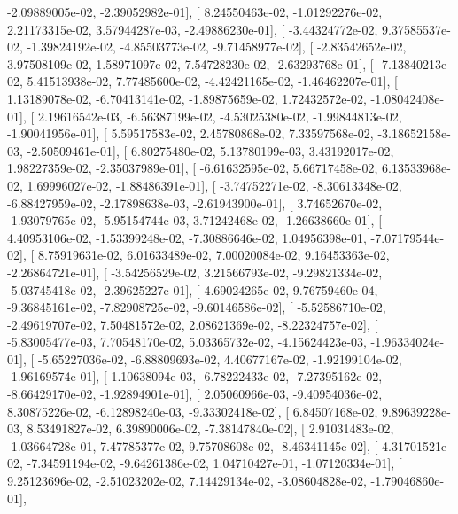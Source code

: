 \documentclass{article}
\begin{document}
         -2.09889005e-02,  -2.39052982e-01],
       [  8.24550463e-02,  -1.01292276e-02,   2.21173315e-02,
          3.57944287e-03,  -2.49886230e-01],
       [ -3.44324772e-02,   9.37585537e-02,  -1.39824192e-02,
         -4.85503773e-02,  -9.71458977e-02],
       [ -2.83542652e-02,   3.97508109e-02,   1.58971097e-02,
          7.54728230e-02,  -2.63293768e-01],
       [ -7.13840213e-02,   5.41513938e-02,   7.77485600e-02,
         -4.42421165e-02,  -1.46462207e-01],
       [  1.13189078e-02,  -6.70413141e-02,  -1.89875659e-02,
          1.72432572e-02,  -1.08042408e-01],
       [  2.19616542e-03,  -6.56387199e-02,  -4.53025380e-02,
         -1.99844813e-02,  -1.90041956e-01],
       [  5.59517583e-02,   2.45780868e-02,   7.33597568e-02,
         -3.18652158e-03,  -2.50509461e-01],
       [  6.80275480e-02,   5.13780199e-03,   3.43192017e-02,
          1.98227359e-02,  -2.35037989e-01],
       [ -6.61632595e-02,   5.66717458e-02,   6.13533968e-02,
          1.69996027e-02,  -1.88486391e-01],
       [ -3.74752271e-02,  -8.30613348e-02,  -6.88427959e-02,
         -2.17898638e-03,  -2.61943900e-01],
       [  3.74652670e-02,  -1.93079765e-02,  -5.95154744e-03,
          3.71242468e-02,  -1.26638660e-01],
       [  4.40953106e-02,  -1.53399248e-02,  -7.30886646e-02,
          1.04956398e-01,  -7.07179544e-02],
       [  8.75919631e-02,   6.01633489e-02,   7.00020084e-02,
          9.16453363e-02,  -2.26864721e-01],
       [ -3.54256529e-02,   3.21566793e-02,  -9.29821334e-02,
         -5.03745418e-02,  -2.39625227e-01],
       [  4.69024265e-02,   9.76759460e-04,  -9.36845161e-02,
         -7.82908725e-02,  -9.60146586e-02],
       [ -5.52586710e-02,  -2.49619707e-02,   7.50481572e-02,
          2.08621369e-02,  -8.22324757e-02],
       [ -5.83005477e-03,   7.70548170e-02,   5.03365732e-02,
         -4.15624423e-03,  -1.96334024e-01],
       [ -5.65227036e-02,  -6.88809693e-02,   4.40677167e-02,
         -1.92199104e-02,  -1.96169574e-01],
       [  1.10638094e-03,  -6.78222433e-02,  -7.27395162e-02,
         -8.66429170e-02,  -1.92894901e-01],
       [  2.05060966e-03,  -9.40954036e-02,   8.30875226e-02,
         -6.12898240e-03,  -9.33302418e-02],
       [  6.84507168e-02,   9.89639228e-03,   8.53491827e-02,
          6.39890006e-02,  -7.38147840e-02],
       [  2.91031483e-02,  -1.03664728e-01,   7.47785377e-02,
          9.75708608e-02,  -8.46341145e-02],
       [  4.31701521e-02,  -7.34591194e-02,  -9.64261386e-02,
          1.04710427e-01,  -1.07120334e-01],
       [  9.25123696e-02,  -2.51023202e-02,   7.14429134e-02,
         -3.08604828e-02,  -1.79046860e-01],
\end{document}
